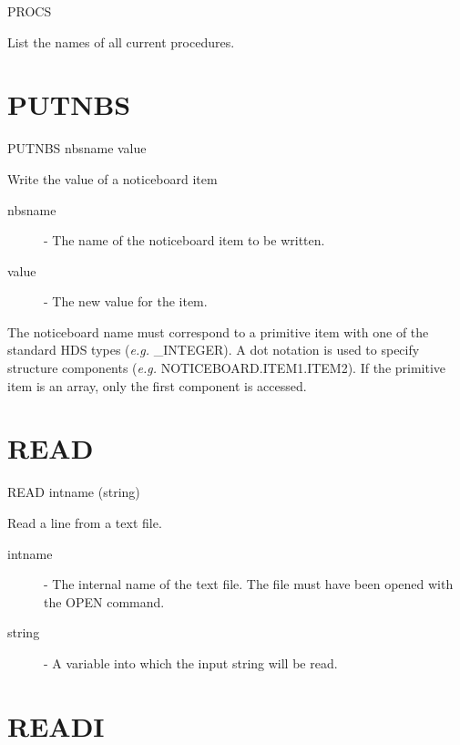 \documentclass[twoside,11pt]{report}
\newcommand{\xlabel}[1]{}
\begin{document}
    PROCS

 List the names of all current procedures.

\section{\xlabel{PUTNBS}PUTNBS\label{PUTNBS}}

   PUTNBS \hspace{.5cm}  nbsname \hspace{.5cm} value

Write the value of a noticeboard item

\begin{description}

\item[nbsname] - The name of the noticeboard item to be written.

\item[value] - The new value for the item.

\end{description}                                

The noticeboard name must correspond to a primitive item with one of the
standard HDS types ({\em e.g.} \_INTEGER). 
A dot notation is used to specify structure
components ({\em e.g.} NOTICEBOARD.ITEM1.ITEM2). 
If the primitive item is an array, only the first component is accessed.


\section{\xlabel{READ}READ\label{READ}}

   READ \hspace{.5cm} intname \hspace{.5cm}  (string)

 Read a line from a text file.
\begin{description}

\item[intname]  -  The internal name of the text file. The file must have
                   been opened with the OPEN command.

\item[string]  -  A variable into which the input string will be read.

\end{description}


\section{\xlabel{READI}READI\label{READI}}
\end{document}
